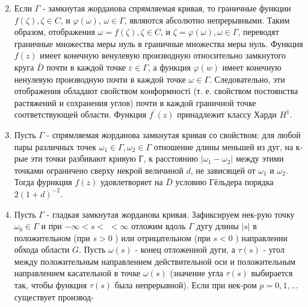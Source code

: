 \documentclass[10pt]{article}
\begin{document}
\begin{enumerate}

  \setcounter{enumi}{1}

  \item Если $\Gamma$ - замкнутая жорданова спрямляемая кривая, то граничные функции $f(\zeta), \zeta \in C$, и $\varphi(\omega)$, $\omega \in \Gamma$, являются абсолютно непрерывными. Таким образом, отображения $\omega=f(\zeta), \zeta \in C$, и $\zeta=\varphi(\omega), \omega \in \Gamma$, переводят граничные множества меры нуль в граничные множества меры нуль. Функция $f(z)$ имеет конечную венулевую производную относительно замкнутого круга $\bar{D}$ почти в каждой точке $\varepsilon \in \Gamma$, а функция $\varphi(w)$ имеет конечную ненулевую производную почти в каждой точке $\omega \in \Gamma$. Следовательно, эти отображения обладают свойством конформності (т. е. свойством постоянства растяжений и сохранения углов) почти в каждой граничной точке соответствующей области. Функция $f^{\prime}(z)$ принадлежит классу Харди $H^{1}$.



  \item Пусть $\Gamma$ - спрямляемая жорданова замкнутая кривая со свойством: для любой пары различных точек $\omega_{1} \in \Gamma, \omega_{2} \in \Gamma$ отношение длины меньшей из дуг, на к-рые эти точки разбивают кривую $Г$, к расстоянию $\left|\omega_{1}-\omega_{2}\right|$ между этими точками ограничено сверху некрой величиной $d$, не зависящей от $\omega_{1}$ и $\omega_{2}$. Тогда фурнкция $f(z)$ удовлетворяет на $\bar{D}$ условию Гёльдера порядка $2(1+d)^{-2}$.



  \item Пусть $\Gamma$ - гладкая замкнутая жорданова кривая. Зафиксируем нек-рую точку $\omega_{0} \in \Gamma$ и при $-\infty<s<$ $<\infty$ отложим вдоль $\Gamma$ дугу длины $|s|$ в положительном (при $s>0$ ) или отрицательном (при $s<0$ ) направлении обхода области $G$. Пусть $\omega(s)$ - конец отложенной дуги, а $\tau(s)$ - угол между положительным направлением действительной оси и положительным направлением касательной в точке $\omega(s)$ (значение угла $\tau(s)$ выбирается так, чтобы функция $\tau(s)$ была непрерывной). Если при нек-ром $p=0,1, \ldots$ существует производ-



\end{enumerate}
\end{document}
